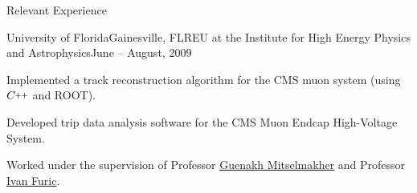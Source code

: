 \documentclass{resume}
\newcommand{\CC}{C\nolinebreak\hspace{-.05em}\raisebox{.4ex}{\tiny\bf +}\nolinebreak\hspace{-.10em}\raisebox{.4ex}{\tiny\bf +}}
\def\CC{{C\nolinebreak[4]\hspace{-.05em}\raisebox{.4ex}{\tiny\bf ++}}}
\begin{document}
\begin{rsection}{Relevant Experience}

  \begin{rsubsection}{University of Florida}{Gainesville, FL}{REU at the Institute for High Energy Physics and Astrophysics}{June -- August, 2009}
  \item Implemented a track reconstruction algorithm for the CMS muon system (using $\CC$ and ROOT). 
  \item Developed trip data analysis software for the CMS Muon Endcap High-Voltage System.
  \item Worked under the supervision of Professor \href{http://www.phys.ufl.edu/~mitselmakher/}{Guenakh Mitselmakher} and Professor \href{http://www.phys.ufl.edu/faculty/furic.shtml}{Ivan Furic}.
  \end{rsubsection}

\end{rsection}

\end{document}
